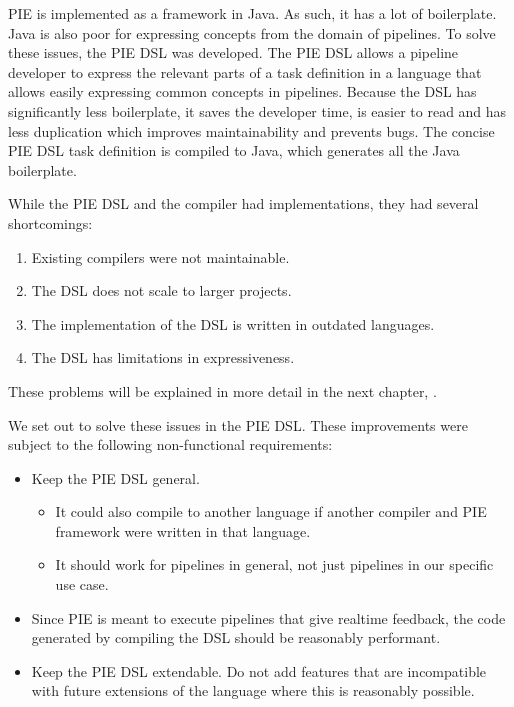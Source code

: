 \Ac{PIE} is implemented as a framework in Java.
As such, it has a lot of boilerplate.
Java is also poor for expressing concepts from the domain of pipelines.
To solve these issues, the \ac{PIE} \ac{DSL} was developed.
The \ac{PIE} \ac{DSL} allows a pipeline developer to express the relevant parts of a task definition in a language that allows easily expressing common concepts in pipelines.
Because the \ac{DSL} has significantly less boilerplate, it saves the developer time, is easier to read and has less duplication which improves maintainability and prevents bugs. 
The concise \ac{PIE} \ac{DSL} task definition is compiled to Java, which generates all the Java boilerplate.

While the \ac{PIE} \ac{DSL} and the compiler had implementations, they had several shortcomings:
\begin{enumerate}
  \item Existing compilers were not maintainable.
  \item The \ac{DSL} does not scale to larger projects.
  \item The implementation of the \ac{DSL} is written in outdated languages.
  \item The \ac{DSL} has limitations in expressiveness.
\end{enumerate}
These problems will be explained in more detail in the next chapter, .

We set out to solve these issues in the \ac{PIE} \ac{DSL}.
These improvements were subject to the following non-functional requirements:
\begin{itemize}
  \item Keep the \ac{PIE} \ac{DSL} general.
  \begin{itemize}
    \item It could also compile to another language if another compiler and \ac{PIE} framework were written in that language.
    \item It should work for pipelines in general, not just pipelines in our specific use case.
  \end{itemize}
  \item Since \ac{PIE} is meant to execute pipelines that give realtime feedback, the code generated by compiling the \ac{DSL} should be reasonably performant.
  \item Keep the \ac{PIE} \ac{DSL} extendable.
  Do not add features that are incompatible with future extensions of the language where this is reasonably possible.
\end{itemize}

